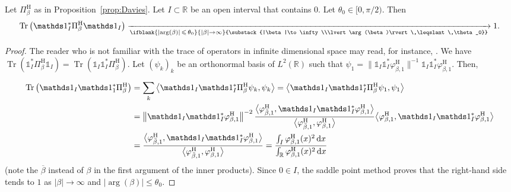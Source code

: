 \documentclass[10pt]{amsart}
\theoremstyle{definition}\newtheorem{defi}[theo]{Definition}\newtheorem{rema}[theo]{Remark}\newtheorem{exam}[theo]{Example}\newtheorem{exem}[theo]{Example}\newtheorem{nota}[theo]{Notation}
\renewcommand{\leq}{\leqslant}
\newcommand{\1}{\mathds 1}
\newcommand{\limt}[3][]{\xrightarrow[\ifblank{#1}{#2 \to #3}{\substack{#2\to #3\\#1}}]{}}
\DeclareMathOperator{\Tr}{Tr}
\newcommand{\R}{\mathbb{R}}
\newcommand{\diff}[1][-3]{\ensuremath{\mathop{}\mkern#1mu\mathrm{d}}}
\newcommand{\h}{{\mathrm{H}}}
\renewcommand{\b}{\beta}
\renewcommand{\th}{\theta}
\newcommand{\f}{\varphi}
\begin{document}
\begin{coro}\label{th-trace-eigenproj}
Let $\Pi_\b^\h$ as in Proposition~\ref{prop:Davies}. Let $I\subset \R$ be an open interval that contains $0$. Let $\th_0 \in [0,\pi/2)$. Then
\[
\Tr\left(\1_I^* \Pi^\h_{\b} \1_I\right) \limt[\lvert \arg(\b)\rvert\,\leq\,\th_0]{|\b|}{\infty} 1.
\]
\end{coro}
\begin{proof}
The reader who is not familiar with the trace of operators in infinite dimensional space may read, for instance, \cite[Chapter~10, \S1.3--1.4]{Kato95}. We have $\Tr(\1_I^* \Pi^\h_{\b} \1_I) = \Tr(\1_I \1_I^* \Pi^\h_{\b})$. Let $(\psi_k)_k$ be an orthonormal basis of $L^2(\R)$ such that $\psi_1 = \|\1_I\1_I^*\f_{\b,1}^\h\|^{-1}\1_I\1_I^*\f_{\b,1}^\h$. Then,

\begin{align*}
\Tr\left(\1_I\1_1^*\Pi_\b^\h\right) &= \sum_k \big\langle\1_I\1_I^*\Pi_\b^\h \psi_k, \psi_k\big\rangle
= \big\langle\1_I\1_I^*\Pi_\b^\h \psi_1, \psi_1\big\rangle\\
&= \left\|\1_I\1_I^*\f_{\b,1}^\h\right\|^{-2}\dfrac {\big\langle \f_{\bar \b,1}^\h,\1_I\1_I^* \f_{\b,1}^\h \big\rangle} {\big\langle \f_{\bar \b,1}^\h, \f_{\b,1}^\h \big\rangle} \big\langle \f_{\b,1}^\h, \1_I\1_I^* \f_{\b,1}^\h\big\rangle\\
&=\dfrac{\big\langle \f_{\bar \b,1}^\h,\1_I\1_I^* \f_{\b,1}^\h \big\rangle} {\big\langle \f_{\bar \b,1}^\h, \f_{\b,1}^\h \big\rangle}
= \dfrac{\int_I \f_{\b,1}^\h(x)^2\diff x}{ \int_\R \f_{\b,1}^\h(x)^2 \diff x}
\end{align*}
(note the $\overline \beta$ instead of $\beta$ in the first argument of the inner products). Since $0\in I$, the saddle point method proves that the right-hand side tends to $1$ as $|\beta|\to \infty$ and $\lvert\arg(\b)\rvert \leq \th_0$.
\end{proof}


\end{document}
